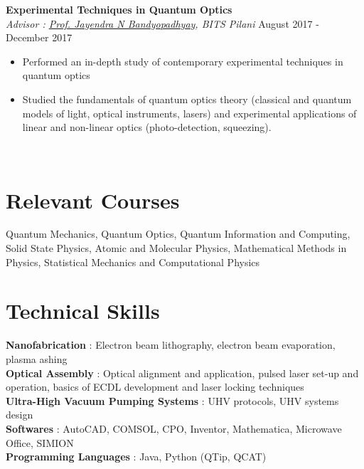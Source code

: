 \documentclass[margin, centered, 11pt]{res}
\begin{document}
\begin{resume}
\textbf{Experimental Techniques in Quantum Optics}\\
\emph{Advisor : \href{https://www.bits-pilani.ac.in/Pilani/jayendra/Profile}{Prof. Jayendra N Bandyopadhyay}, BITS Pilani} \hfill August 2017 - December 2017
\begin{itemize}[noitemsep, label=\raisebox{0.35ex}{\tiny$\bullet$}]
\item Performed an in-depth study of contemporary experimental techniques in quantum optics
\item Studied the fundamentals of quantum optics theory (classical and quantum models of light, optical instruments, lasers) and experimental applications of linear and non-linear optics (photo-detection, squeezing).
\end{itemize}\\


\section{Relevant \hspace{2mm} Courses}
Quantum Mechanics, Quantum Optics, Quantum Information and Computing, Solid State Physics, Atomic and Molecular Physics, Mathematical Methods in Physics, Statistical Mechanics and Computational Physics

\section{Technical \hspace{2mm} Skills}

\textbf{Nanofabrication} : Electron beam lithography, electron beam evaporation, plasma ashing \\
\textbf{Optical Assembly} : Optical alignment and application, pulsed laser set-up and operation, basics of ECDL development and laser locking techniques\\
\textbf{Ultra-High Vacuum Pumping Systems} : UHV protocols, UHV systems design\\
\textbf{Softwares} :  AutoCAD, COMSOL, CPO, Inventor, Mathematica, Microwave Office, SIMION  \\
\textbf{Programming Languages} : Java, Python (QTip, QCAT)



\end{resume}
\end{document}
